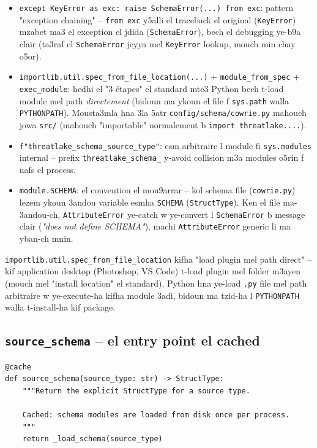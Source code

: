 \documentclass[11pt,a4paper]{report}
\DeclareRobustCommand{\code}[1]{\texttt{#1}}
\begin{document}
\begin{itemize}
  \item \code{except KeyError as exc: raise SchemaError(...) from exc}:
        pattern "exception chaining" -- \code{from exc} y5alli el traceback
        el original (\code{KeyError}) mzabet ma3 el exception el jdida
        (\code{SchemaError}), bech el debugging ye-b9a clair (ta3raf el
        \code{SchemaError} jeyya mel \code{KeyError} lookup, mouch min
        chay o5or).
  \item \code{importlib.util.spec\_from\_file\_location(...)} +
        \code{module\_from\_spec} + \code{exec\_module}: hedhi el
        "3 étapes" el standard mte3 Python bech t-load module mel path
        \emph{directement} (bidoun ma ykoun el file f \code{sys.path} walla
        \code{PYTHONPATH}). Mousta3mla hna 3la 5atr \code{config/schema/cowrie.py}
        mahouch jowa \code{src/} (mahouch "importable" normalement b
        \code{import threatlake....}).
  \item \code{f"threatlake\_schema\_{source\_type}"}: esm arbitraire l
        module fi \code{sys.modules} internal -- prefix \code{threatlake\_schema\_}
        y-avoid collision m3a modules o5rin f nafs el process.
  \item \code{module.SCHEMA}: el convention el mou9arrar -- kol schema file
        (\code{cowrie.py}) lezem ykoun 3andou variable esmha \code{SCHEMA}
        (\code{StructType}). Ken el file ma-3andou-ch, \code{AttributeError}
        ye-catch w ye-convert l \code{SchemaError} b message clair (\emph{"does
        not define SCHEMA"}), machi \code{AttributeError} generic li ma
        yban-ch mnin.
\end{itemize}

\begin{analogy}
\code{importlib.util.spec\_from\_file\_location} kifha "load plugin mel
path direct" -- kif application desktop (Photoshop, VS Code) t-load plugin
mel folder m3ayen (mouch mel "install location" el standard), Python hna
ye-load \code{.py} file mel path arbitraire w ye-execute-ha kifha module
3adi, bidoun ma tzid-ha l \code{PYTHONPATH} walla t-install-ha kif package.
\end{analogy}

\subsection{\code{source\_schema} -- el entry point el cached}

\begin{lstlisting}[style=pystyle]
@cache
def source_schema(source_type: str) -> StructType:
    """Return the explicit StructType for a source type.

    Cached: schema modules are loaded from disk once per process.
    """
    return _load_schema(source_type)
\end{lstlisting}
\end{document}
